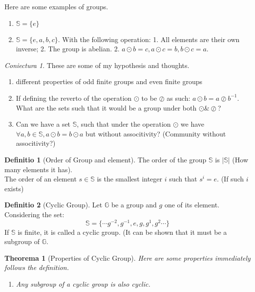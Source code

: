 \documentclass[12pt, a4paper]{report}
\newtheorem{theorem}{Theorema}[section]
\theoremstyle{definition}
\newtheorem{definition}{Definitio}[section]
\theoremstyle{definition}
\theoremstyle{remark}
\newtheorem{hypothesis}{Coniectura}[section]
\begin{document}
Here are some examples of groups. 
\begin{enumerate}
	\item $\mathbb{S}=\{e\}$
	\item $\mathbb{S} = \{e, a, b, c\}.$ With the following operation:
		1. All elements are their own inverse; 
		2. The group is abelian.
		2. $a \odot b = c, a \odot c = b, b \odot c = a$.
\end{enumerate}
\begin{hypothesis}
	These are some of my hypothesis and thoughts.
	\begin{enumerate}
		\item different properties of odd finite groups and even finite groups
		\item If defining the reverto of the operation $\odot $ to be $\oslash $ as such: $a \odot b = a \oslash b^{-1}$. What are the sets such that it would be a group under both $\odot \& \oslash$?
		\item Can we have a set $\mathbb{S}$, such that under the operation $\odot $ we have $\forall a, b \in \mathbb{S}, a \odot b = b \odot  a$ but without associtivity? (Community without associtivity?)
	\end{enumerate}
\end{hypothesis}
\begin{definition}[Order of Group and element]
The order of the group $\mathbb{S}$ is $|\mathbb{S}|$ (How many elements it has). \\
The order of an element $s \in \mathbb{S}$ is the smallest integer $i$ such that $s^i = e.$ (If such $i$ exists)
\end{definition}

\begin{definition}[Cyclic Group]
Let $\mathbb{G}$ be a group and $g$ one of its element. Considering the set:
\[
	\mathbb{S} = \{\cdots g^{-2}, g^{-1}, e, g, g^1, g^2 \cdots\}  
\]
If $\mathbb{S}$ is finite, it is called a cyclic group. (It can be shown that it must be a subgroup of $\mathbb{G}$.
\end{definition}

\begin{theorem}[Properties of Cyclic Group]
Here are some properties immediately follows the definition.
\begin{enumerate}
	\item Any subgroup of a cyclic group is also cyclic.
\end{enumerate}	
\end{theorem}
\end{document}
